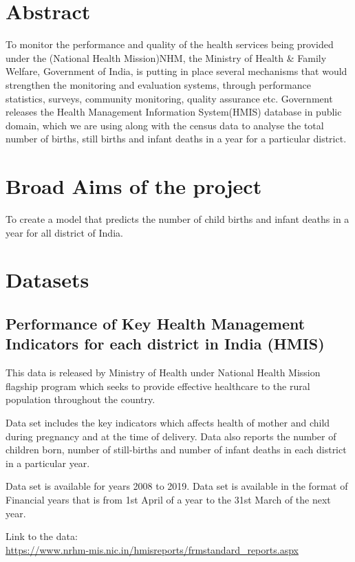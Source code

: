 \documentclass[12pt]{article}
\begin{document}
\section{Abstract}
\justifying
To monitor the performance and quality of the health services being provided under the (National Health Mission)NHM, the Ministry of Health & Family Welfare, Government of India, is putting in place several mechanisms that would strengthen the monitoring and evaluation systems, through performance statistics, surveys, community monitoring, quality assurance etc. Government releases the Health Management Information System(HMIS) database in public domain, which we are using along with the census data to analyse the total number of births, still births and infant deaths in a year for a particular district.

\section{Broad Aims of the project}
To create a model that predicts the number of child births and infant deaths in a year for all district of India.

\setlength{\parindent}{0em}

\section{Datasets}
\subsection{Performance of Key Health Management Indicators for each district in India (HMIS)}

This data is released by Ministry of Health under National Health Mission flagship program which seeks to provide effective healthcare to the rural population throughout the country.

\bigskip

Data set includes the key indicators which affects health of mother and child during pregnancy and at the time of delivery. Data also reports the number of children born, number of still-births and number of infant deaths in each district in a particular year.

Data set is available for years 2008 to 2019. Data set is available in the format of Financial years that is from 1st April of a year to the 31st March of the next year.

\bigskip

Link to the data:\\ \url{https://www.nrhm-mis.nic.in/hmisreports/frmstandard_reports.aspx}
\end{document}

